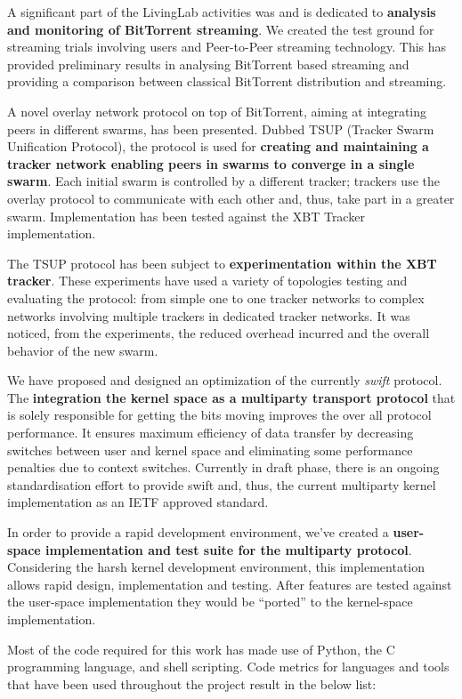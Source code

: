 A significant part of the LivingLab activities was and is dedicated to
\textbf{analysis and monitoring of BitTorrent streaming}. We created the test
ground for streaming trials involving users and Peer-to-Peer streaming
technology. This has provided preliminary results in analysing BitTorrent
based streaming and providing a comparison between classical BitTorrent
distribution and streaming.

A novel overlay network protocol on top of BitTorrent, aiming at integrating
peers in different swarms, has been presented. Dubbed TSUP (Tracker Swarm
Unification Protocol), the protocol is used for \textbf{creating and
maintaining a tracker network enabling peers in swarms to converge in a single
swarm}. Each initial swarm is controlled by a different tracker; trackers use
the overlay protocol to communicate with each other and, thus, take part in a
greater swarm. Implementation has been tested against the XBT Tracker
implementation.

The TSUP protocol has been subject to \textbf{experimentation within the XBT
tracker}. These experiments have used a variety of topologies testing and
evaluating the protocol: from simple one to one tracker networks to complex
networks involving multiple trackers in dedicated tracker networks. It was
noticed, from the experiments, the reduced overhead incurred and the overall
behavior of the new swarm.

We have proposed and designed an optimization of the currently \textit{swift}
protocol. The \textbf{integration the kernel space as a multiparty transport
protocol} that is solely responsible for getting the bits moving improves the
over all protocol performance. It ensures maximum efficiency of data transfer
by decreasing switches between user and kernel space and eliminating some
performance penalties due to context switches. Currently in draft phase,
there is an ongoing standardisation effort to provide swift and, thus, the
current multiparty kernel implementation as an IETF approved standard.

In order to provide a rapid development environment, we've created a
\textbf{user-space implementation and test suite for the multiparty protocol}.
Considering the harsh kernel development environment, this implementation
allows rapid design, implementation and testing. After features are tested
against the user-space implementation they would be ``ported'' to the
kernel-space implementation.

Most of the code required for this work has made use of Python, the C
programming language, and shell scripting. Code metrics for languages and
tools that have been used throughout the project result in the below list:

